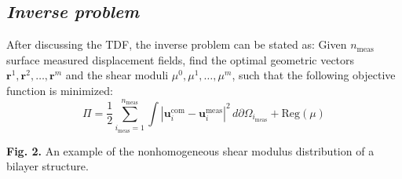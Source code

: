 \documentclass[11pt]{article}
\begin{document}
\subsection*{\textit{Inverse problem}}

\noindent
After discussing the TDF, the inverse problem can be stated as:
Given $n_{\text{meas}}$ surface measured displacement fields, find
the optimal geometric vectors $\mathbf{r}^1, \mathbf{r}^2, \ldots,
\mathbf{r}^m$ and the shear moduli $\mu^0, \mu^1, \ldots, \mu^m$,
such that the following objective function is minimized:
\begin{equation}
\Pi = \dfrac{1}{2} \sum_{i_{\text{meas}}=1}^{n_{\text{meas}}}
\int \left|\mathbf{u}_i^{\text{com}} - \mathbf{u}_i^{\text{meas}}\right|^{2}
\, d\partial\Omega_{i_{\text{meas}}} + \text{Reg}(\mu)
\end{equation}

\vspace{1em}
\begin{center}
\end{center}
\vspace{0.4em}
\begin{center}
\textbf{Fig. 2.} An example of the nonhomogeneous shear modulus
distribution of a bilayer structure.
\end{center}

\newpage

\setcounter{equation}{14}
\end{document}
